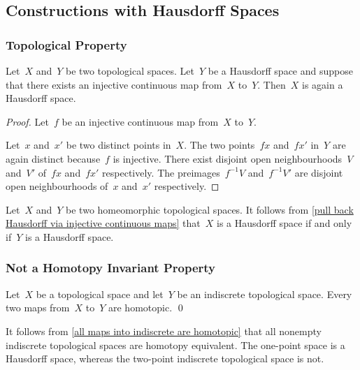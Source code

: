 \subsection{Constructions with Hausdorff Spaces}



\subsubsection{Topological Property}

\begin{lemma}
	\label{pull back Hausdorff via injective continuous maps}
	Let~$X$ and~$Y$ be two topological spaces.
	Let~$Y$ be a Hausdorff space and suppose that there exists an injective continuous map from~$X$ to~$Y$.
	Then~$X$ is again a Hausdorff space.
\end{lemma}

\begin{proof}
	Let~$f$ be an injective continuous map from~$X$ to~$Y$.

	Let~$x$ and~$x'$ be two distinct points in~$X$.
	The two points~$f x$ and~$f x'$ in~$Y$ are again distinct because~$f$ is injective.
	There exist disjoint open neighbourhoods~$V$ and~$V'$ of~$f x$ and~$f x'$ respectively.
	The preimages~$f^{-1} V$ and~$f^{-1} V'$ are disjoint open neighbourhoods of~$x$ and~$x'$ respectively.
\end{proof}

Let~$X$ and~$Y$ be two homeomorphic topological spaces.
It follows from \cref{pull back Hausdorff via injective continuous maps} that~$X$ is a Hausdorff space if and only if~$Y$ is a Hausdorff space.



\subsubsection{Not a Homotopy Invariant Property}

\begin{lemma}
	\label{all maps into indiscrete are homotopic}
	Let~$X$ be a topological space and let~$Y$ be an indiscrete topological space.
	Every two maps from~$X$ to~$Y$ are homotopic.
	\qed
\end{lemma}

It follows from \cref{all maps into indiscrete are homotopic} that all nonempty indiscrete topological spaces are homotopy equivalent.
The one-point space is a Hausdorff space, whereas the two-point indiscrete topological space is not.



